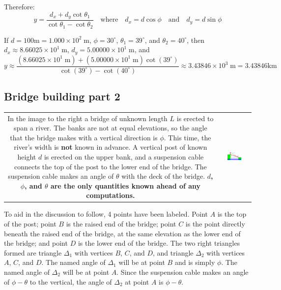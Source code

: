 \documentclass{article}
\begin{document}
Therefore: 
\[y = \frac{d_x + d_y\cot\theta_1}{\cot\theta_1 - \cot\theta_2} \quad \text{where} \quad d_x = d\cos\phi \quad \text{and} \quad d_y = d\sin\phi\]

If \(d = 100\text{m} = 1.000 \times 10^2 \;\text{m}\), \(\phi = 30^\circ\), \(\theta_1 = 39^\circ\), and \(\theta_2 = 40^\circ\), then \\
\(d_x \approx 8.66025 \times 10^1 \;\text{m}\), \(d_y = 5.00000 \times 10^1 \;\text{m}\), and 
\[y \approx \frac{(8.66025 \times 10^1 \;\text{m}) + (5.00000 \times 10^1 \;\text{m})\cot(39^\circ)}{\cot(39^\circ) - \cot(40^\circ)} \approx 3.43846 \times 10^3 \;\text{m} = 3.43846\text{km}\]





\subsection*{Bridge building part 2}

\begin{tabular}{cc}
\parbox{0.5\textwidth}{
In the image to the right a bridge of unknown length \(L\) is erected to span a river. The banks are not at equal elevations, so the angle that the bridge makes with a vertical direction is \(\phi\). This time, the river's width is {\bf not} known in advance. A vertical post of known height \(d\) is erected on the upper bank, and a suspension cable connects the top of the post to the lower end of the bridge. The suspension cable makes an angle of \(\theta\) with the deck of the bridge.  {\bf \(d\), \(\phi\), and \(\theta\) are the only quantities known ahead of any computations.} 
} & \parbox{0.5\textwidth}{
\includegraphics[width = 0.5\textwidth]{bridge_building_2}
}
\end{tabular}
To aid in the discussion to follow, 4 points have been labeled. Point \(A\) is the top of the post; point \(B\) is the raised end of the bridge; point \(C\) is the point directly beneath the raised end of the bridge, at the same elevation as the lower end of the bridge; and point \(D\) is the lower end of the bridge. The two right triangles formed are triangle \(\Delta_1\) with vertices \(B\), \(C\), and \(D\), and triangle \(\Delta_2\) with vertices \(A\), \(C\), and \(D\). The named angle of \(\Delta_1\) will be at point \(B\) and is simply \(\phi\). The named angle of \(\Delta_2\) will be at point \(A\). Since the suspension cable makes an angle of \(\phi - \theta\) to the vertical, the angle of \(\Delta_2\) at point \(A\) is \(\phi - \theta\). 
\end{document}

